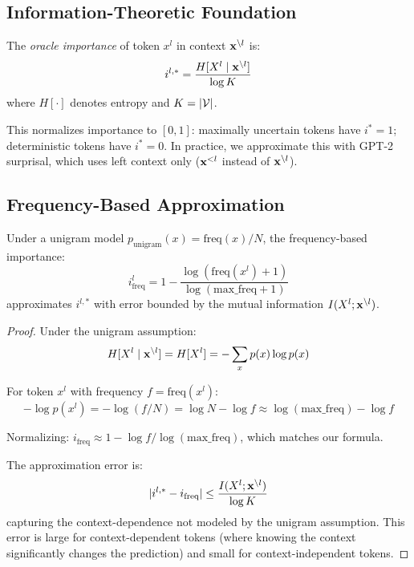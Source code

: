 \subsection{Information-Theoretic Foundation}

\begin{definition}
The \emph{oracle importance} of token $x^l$ in context $\mathbf{x}^{\setminus l}$ is:
\begin{equation}
    i^{l,*} = \frac{H[X^l \mid \mathbf{x}^{\setminus l}]}{\log K}
\end{equation}
where $H[\cdot]$ denotes entropy and $K = |\mathcal{V}|$.
\end{definition}

This normalizes importance to $[0,1]$: maximally uncertain tokens have $i^* = 1$; deterministic tokens have $i^* = 0$. In practice, we approximate this with GPT-2 surprisal, which uses left context only ($\mathbf{x}^{<l}$ instead of $\mathbf{x}^{\setminus l}$).

\subsection{Frequency-Based Approximation}

\begin{proposition}
\label{prop:freq-proxy}
Under a unigram model $p_{\text{unigram}}(x) = \text{freq}(x)/N$, the frequency-based importance:
\begin{equation}
    i^l_{\text{freq}} = 1 - \frac{\log(\text{freq}(x^l) + 1)}{\log(\text{max\_freq} + 1)}
\end{equation}
approximates $i^{l,*}$ with error bounded by the mutual information $I(X^l; \mathbf{x}^{\setminus l})$.
\end{proposition}

\begin{proof}
Under the unigram assumption:
\begin{equation}
    H[X^l \mid \mathbf{x}^{\setminus l}] = H[X^l] = -\sum_x p(x) \log p(x)
\end{equation}

For token $x^l$ with frequency $f = \text{freq}(x^l)$:
\begin{equation}
    -\log p(x^l) = -\log(f/N) = \log N - \log f \approx \log(\text{max\_freq}) - \log f
\end{equation}

Normalizing: $i_{\text{freq}} \approx 1 - \log f / \log(\text{max\_freq})$, which matches our formula.

The approximation error is:
\begin{equation}
    |i^{l,*} - i_{\text{freq}}| \leq \frac{I(X^l; \mathbf{x}^{\setminus l})}{\log K}
\end{equation}
capturing the context-dependence not modeled by the unigram assumption. This error is large for context-dependent tokens (where knowing the context significantly changes the prediction) and small for context-independent tokens.
\end{proof}

